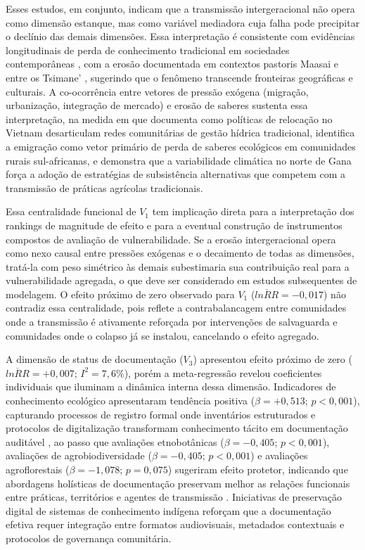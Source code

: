 \documentclass[12pt,a4paper]{article}
\begin{document}
Esses estudos, em conjunto, indicam que a transmissão intergeracional não opera como dimensão estanque, mas como variável mediadora cuja falha pode precipitar o declínio das demais dimensões. Essa interpretação é consistente com evidências longitudinais de perda de conhecimento tradicional em sociedades contemporâneas \citep{ReyesGarcia2013evidence}, com a erosão documentada em contextos pastoris Maasai \citep{HedgesKipila2020} e entre os Tsimane' \citep{Gruberg2022}, sugerindo que o fenômeno transcende fronteiras geográficas e culturais. A co-ocorrência entre vetores de pressão exógena (migração, urbanização, integração de mercado) e erosão de saberes sustenta essa interpretação, na medida em que \citet{Tran2025} documenta como políticas de relocação no Vietnam desarticulam redes comunitárias de gestão hídrica tradicional, \citet{Moller2023} identifica a emigração como vetor primário de perda de saberes ecológicos em comunidades rurais sul-africanas, e \citet{Aniah2019} demonstra que a variabilidade climática no norte de Gana força a adoção de estratégias de subsistência alternativas que competem com a transmissão de práticas agrícolas tradicionais.

Essa centralidade funcional de $V_1$ tem implicação direta para a interpretação dos rankings de magnitude de efeito e para a eventual construção de instrumentos compostos de avaliação de vulnerabilidade. Se a erosão intergeracional opera como nexo causal entre pressões exógenas e o decaimento de todas as dimensões, tratá-la com peso simétrico às demais subestimaria sua contribuição real para a vulnerabilidade agregada, o que deve ser considerado em estudos subsequentes de modelagem. O efeito próximo de zero observado para $V_1$ ($\overline{lnRR} = -0{,}017$) não contradiz essa centralidade, pois reflete a contrabalancagem entre comunidades onde a transmissão é ativamente reforçada por intervenções de salvaguarda e comunidades onde o colapso já se instalou, cancelando o efeito agregado.

A dimensão de status de documentação ($V_3$) apresentou efeito próximo de zero ($\overline{lnRR} = +0{,}007$; $I^2 = 7{,}6\%$), porém a meta-regressão revelou coeficientes individuais que iluminam a dinâmica interna dessa dimensão. Indicadores de conhecimento ecológico apresentaram tendência positiva ($\beta = +0{,}513$; $p < 0{,}001$), capturando processos de registro formal onde inventários estruturados e protocolos de digitalização transformam conhecimento tácito em documentação auditável \citep{Zeleke2025,Suwardi2025}, ao passo que avaliações etnobotânicas ($\beta = -0{,}405$; $p < 0{,}001$), avaliações de agrobiodiversidade ($\beta = -0{,}405$; $p < 0{,}001$) e avaliações agroflorestais ($\beta = -1{,}078$; $p = 0{,}075$) sugeriram efeito protetor, indicando que abordagens holísticas de documentação preservam melhor as relações funcionais entre práticas, territórios e agentes de transmissão \citep{Maina2012,Poorna2014}. Iniciativas de preservação digital de sistemas de conhecimento indígena \citep{Balogun2021} reforçam que a documentação efetiva requer integração entre formatos audiovisuais, metadados contextuais e protocolos de governança comunitária.
\end{document}
